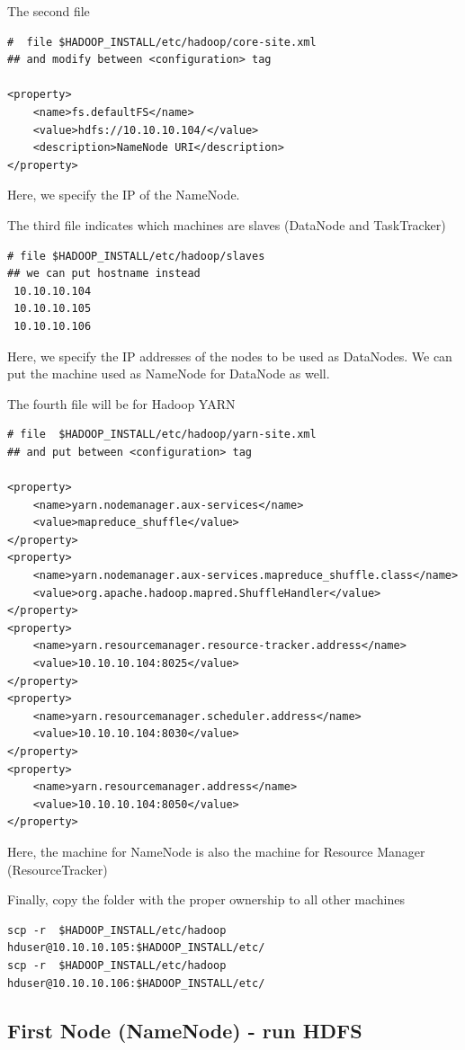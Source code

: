 The second file 
\begin{verbatim}
#  file $HADOOP_INSTALL/etc/hadoop/core-site.xml
## and modify between <configuration> tag

<property>
    <name>fs.defaultFS</name>
    <value>hdfs://10.10.10.104/</value>
    <description>NameNode URI</description>
</property>
\end{verbatim}
Here, we specify the IP of the NameNode.

The third file indicates which machines are slaves (DataNode and TaskTracker)
\begin{verbatim}
# file $HADOOP_INSTALL/etc/hadoop/slaves
## we can put hostname instead
 10.10.10.104
 10.10.10.105
 10.10.10.106
\end{verbatim}
Here, we specify the IP addresses of the nodes to be used as DataNodes.
We can put the machine used as NameNode for DataNode as well.

The fourth file will be for Hadoop YARN
\begin{verbatim}
# file  $HADOOP_INSTALL/etc/hadoop/yarn-site.xml
## and put between <configuration> tag

<property>
    <name>yarn.nodemanager.aux-services</name>
    <value>mapreduce_shuffle</value>
</property>
<property>
    <name>yarn.nodemanager.aux-services.mapreduce_shuffle.class</name>
    <value>org.apache.hadoop.mapred.ShuffleHandler</value>
</property>
<property>
    <name>yarn.resourcemanager.resource-tracker.address</name>
    <value>10.10.10.104:8025</value>
</property>
<property>
    <name>yarn.resourcemanager.scheduler.address</name>
    <value>10.10.10.104:8030</value>
</property>
<property>
    <name>yarn.resourcemanager.address</name>
    <value>10.10.10.104:8050</value>
</property>
\end{verbatim}
Here, the machine for NameNode is also the machine for Resource Manager
(ResourceTracker)



Finally, copy the folder with the proper ownership to all other machines
\begin{verbatim}
scp -r  $HADOOP_INSTALL/etc/hadoop  hduser@10.10.10.105:$HADOOP_INSTALL/etc/
scp -r  $HADOOP_INSTALL/etc/hadoop  hduser@10.10.10.106:$HADOOP_INSTALL/etc/
\end{verbatim}

\subsection{First Node (NameNode) - run HDFS}
\label{sec:HDFS-run}

